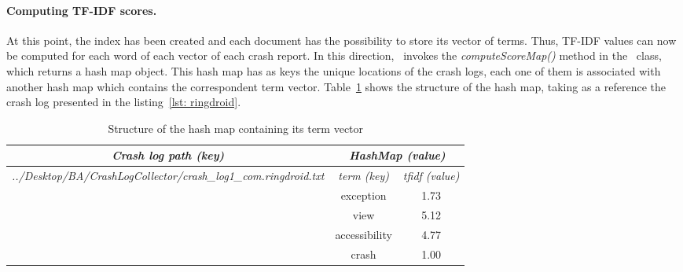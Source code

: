 \paragraph{Computing TF-IDF scores.} 
At this point, the index has been created and each document has the possibility to store its vector of terms. 
Thus, TF-IDF values can now be computed for each word of each vector of each crash report. 
In this direction, \toolname\ invokes the \textit{computeScoreMap()} method in the \TFIDF\ class, which returns a hash map object. 
This hash map has as keys the unique locations of the crash logs, each one of them is associated with another hash map which contains the correspondent term vector.
Table~\ref{tbl: scoremap} shows the structure of the hash map, taking as a reference the crash log presented in the listing~\ref{lst: ringdroid}. 
\begin{table}[tb]
\centering
\caption{Structure of the hash map containing its term vector}
\label{tbl: scoremap}
\begin{tabular}{l|c|c|}
\hline
\multicolumn{1}{|c|}{{\color[HTML]{000000} \textit{\textbf{Crash log path (key)}}}}                                 & \multicolumn{2}{c|}{{\color[HTML]{000000} \textit{\textbf{HashMap (value)}}}} \\ \hline
\multicolumn{1}{|l|}{\textit{../Desktop/BA/CrashLogCollector/crash\_log1\_com.ringdroid.txt}} & {\textit{term (key)}}                   & { \textit{tfidf (value)}}                  \\ \hline
                                                                                                            & \hspace{0.7cm}exception\hspace{0.7cm}                             & \hspace{0.2cm}1.73\hspace{0.2cm}                                      \\ \cline{2-3} 
                                                                                                            & view                               & 5.12                                  \\ \cline{2-3} 
                                                                                                            & accessibility                         & 4.77                                  \\ \cline{2-3} 
                                                                                                            & crash                                 & 1.00                                  \\ \cline{2-3} 

\end{tabular}
\end{table}
